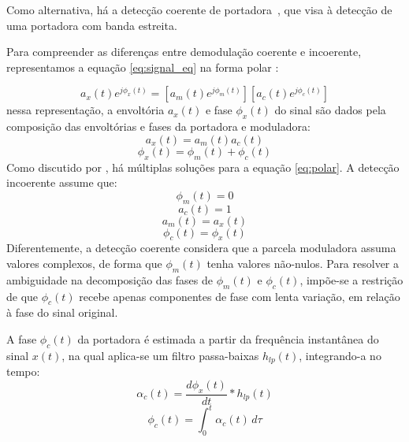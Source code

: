 Como alternativa, há a detecção coerente de
portadora~\cite{atlas2005,clark2009time,clark2009sum}, que visa à detecção de
uma portadora com banda estreita.

Para compreender as diferenças entre demodulação coerente e incoerente,
representamos a equação \ref{eq:signal_eq} na forma polar \cite{schimmel2007}:

\begin{equation}  \label{eq:polar}
    a_x(t) e^{j \phi_x(t)} = \left[ a_m(t) e^{j \phi_m(t)} \right] \left[ a_c(t) e^{j \phi_c(t)}\right]
\end{equation}
nessa representação, a envoltória $a_x(t)$ e fase $\phi_x(t)$ do sinal são dados
pela composição das envoltórias e fases da portadora e moduladora:
\begin{equation}
    a_x(t) = a_m(t) a_c(t)
\end{equation}
\begin{equation}
    \phi_x(t) = \phi_m(t) + \phi_c(t)    
\end{equation}
Como discutido por \citet{cohen1999ambiguity}, há múltiplas soluções para a equação \ref{eq:polar}. A detecção incoerente assume que:
\begin{equation}
    \phi_m(t) = 0
\end{equation}
\begin{equation}
    a_c(t) = 1
\end{equation}
\begin{equation}
    a_m(t) = a_x(t)
\end{equation}
\begin{equation}
    \phi_c(t) = \phi_x(t)
\end{equation}
Diferentemente, a detecção coerente considera que a parcela moduladora assuma
valores complexos, de forma que $\phi_m(t)$ tenha valores não-nulos. Para
resolver a ambiguidade na decomposição das fases de $\phi_m(t)$ e $\phi_c(t)$,
impõe-se a restrição de que $\phi_c(t)$ recebe apenas componentes de fase com
lenta variação, em relação à fase do sinal original.

A fase $\phi_c(t)$ da portadora é estimada a partir da frequência instantânea do
sinal $x(t)$, na qual aplica-se um filtro passa-baixas $h_{lp}(t)$, integrando-a
no tempo:
\begin{equation}
    \alpha_c(t) = \frac{d\phi_x(t)}{dt} * h_{lp}(t)
\end{equation}
\begin{equation}\label{eqn:carrier_integral}
    \phi_c(t) = \int_{0}^{t}\alpha_c(t)\,d\tau 
\end{equation}

